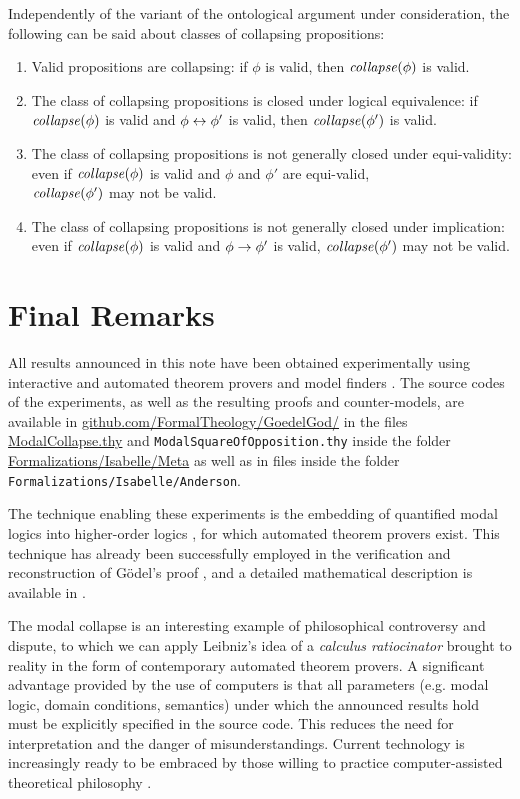 \documentclass{birkmult}
\theoremstyle{definition}
\theoremstyle{remark}
\numberwithin{equation}{section}
\begin{document}
Independently of the variant of the ontological argument 
under consideration, the following can be said about 
classes of collapsing propositions:
\begin{enumerate}
\item Valid propositions are collapsing: 
if $\phi$ is valid, then $\mathit{collapse}(\phi)$ is valid.
%
\item The class of collapsing propositions 
is closed under logical equivalence: 
if $\mathit{collapse}(\phi)$ is valid and $\phi \leftrightarrow \phi'$ is valid, 
then $\mathit{collapse}(\phi')$ is valid.
%
\item The class of collapsing propositions is 
not generally closed under equi-validity: 
even if $\mathit{collapse}(\phi)$ is valid and $\phi$ and $\phi'$ 
are equi-valid, \\ $\mathit{collapse}(\phi')$ may not be valid.
%
\item The class of collapsing propositions is 
not generally closed under implication: 
even if $\mathit{collapse}(\phi)$ is valid and 
$\phi \rightarrow \phi'$ is valid, 
$\mathit{collapse}(\phi')$ may not be valid.
\end{enumerate}



\section{Final Remarks}

\sloppy All results announced in this note have been 
obtained experimentally using interactive and 
automated theorem provers and model finders
\cite{LEO,Satallax,Isabelle,Coq,Nitpick}.  
The source codes of the experiments, 
as well as the resulting proofs and counter-models, 
are available in
\url{github.com/FormalTheology/GoedelGod/}
in the files \url{ModalCollapse.thy} and \texttt{ModalSquareOfOpposition.thy} inside the folder \url{Formalizations/Isabelle/Meta} as well as in files inside the folder \texttt{Formalizations/Isabelle/Anderson}.

The technique enabling these experiments is the embedding of 
quantified modal logics into higher-order logics 
\cite{J23,B9,C36}, for which automated theorem provers exist. 
This technique has already been successfully employed in the 
verification and reconstruction of G\"odel's proof 
\cite{J28,J30,W50,J29}, and a detailed 
mathematical description is available in \cite{C40}.

The modal collapse is an interesting example of philosophical 
controversy and dispute, to which we can apply Leibniz's idea 
of a \emph{calculus ratiocinator} brought to reality in the 
form of contemporary automated theorem provers. 
A significant advantage provided by the use of computers is 
that all parameters (e.g. modal logic, domain conditions, 
semantics) under which the announced results hold must be 
explicitly specified in the source code. This reduces the need 
for interpretation and the danger of misunderstandings. 
Current technology is increasingly ready to be embraced by 
those willing to practice computer-assisted theoretical 
philosophy \cite{oppenheimera11,rushby13}.
\end{document}
